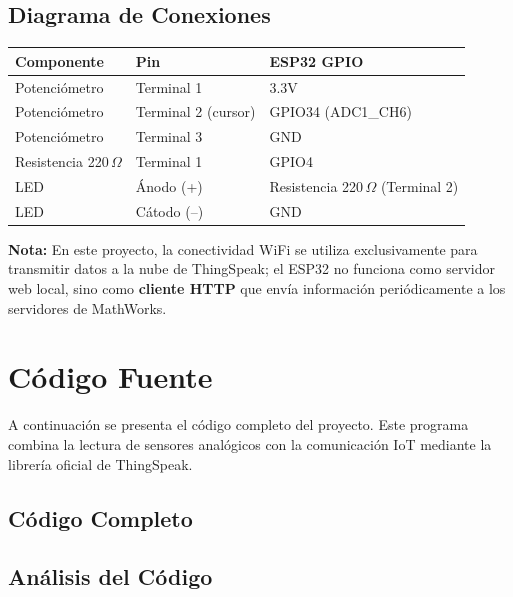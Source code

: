 \documentclass[12pt,a4paper]{article}
\begin{document}
\subsection{Diagrama de Conexiones}

\begin{center}
\begin{tabular}{lll}
\toprule
\textbf{Componente} & \textbf{Pin} & \textbf{ESP32 GPIO} \\
\midrule
Potenciómetro & Terminal 1 & 3.3V \\
Potenciómetro & Terminal 2 (cursor) & GPIO34 (ADC1\_CH6) \\
Potenciómetro & Terminal 3 & GND \\
Resistencia 220\,$\Omega$ & Terminal 1 & GPIO4 \\
LED & Ánodo (+) & Resistencia 220\,$\Omega$ (Terminal 2) \\
LED & Cátodo (--) & GND \\
\bottomrule
\end{tabular}
\end{center}

\textbf{Nota:} En este proyecto, la conectividad WiFi se utiliza exclusivamente para transmitir datos a la nube de ThingSpeak; el ESP32 no funciona como servidor web local, sino como \textbf{cliente HTTP} que envía información periódicamente a los servidores de MathWorks.

\section{Código Fuente}

A continuación se presenta el código completo del proyecto. Este programa combina la lectura de sensores analógicos con la comunicación IoT mediante la librería oficial de ThingSpeak.

\subsection{Código Completo}


\subsection{Análisis del Código}
\end{document}
